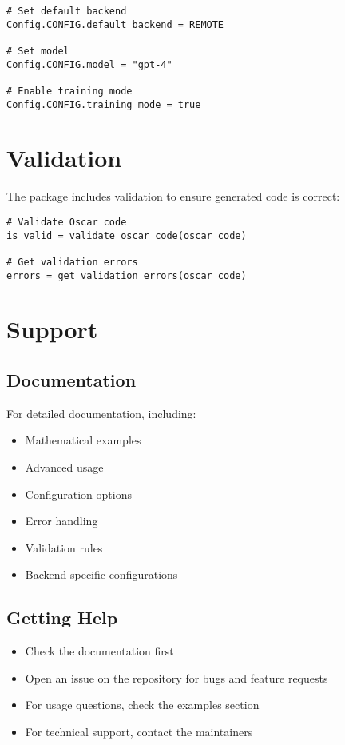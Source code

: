 \documentclass[11pt,a4paper]{article}
\begin{document}
\begin{lstlisting}
# Set default backend
Config.CONFIG.default_backend = REMOTE

# Set model
Config.CONFIG.model = "gpt-4"

# Enable training mode
Config.CONFIG.training_mode = true
\end{lstlisting}

\section{Validation}

The package includes validation to ensure generated code is correct:

\begin{lstlisting}
# Validate Oscar code
is_valid = validate_oscar_code(oscar_code)

# Get validation errors
errors = get_validation_errors(oscar_code)
\end{lstlisting}

\section{Support}
\label{sec:support}

\subsection{Documentation}
For detailed documentation, including:
\begin{itemize}
    \item Mathematical examples
    \item Advanced usage
    \item Configuration options
    \item Error handling
    \item Validation rules
    \item Backend-specific configurations
\end{itemize}

\subsection{Getting Help}
\begin{itemize}
    \item Check the documentation first
    \item Open an issue on the repository for bugs and feature requests
    \item For usage questions, check the examples section
    \item For technical support, contact the maintainers
\end{itemize}
\end{document}
